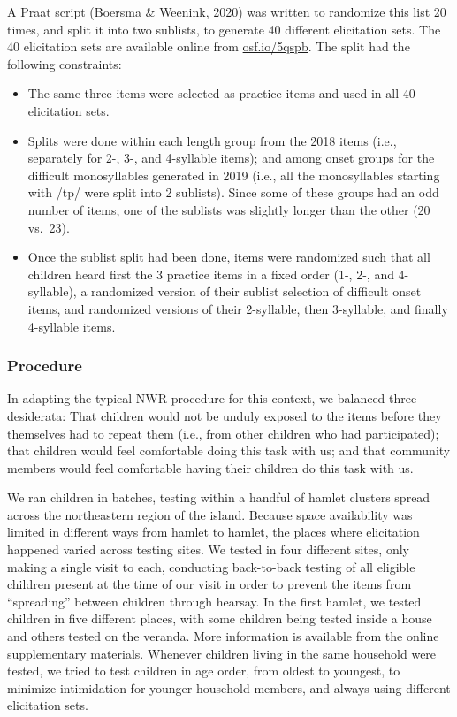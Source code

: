 \documentclass[english,,man,floatsintext]{apa6}
\providecommand{\tightlist}{%
  \setlength{\itemsep}{0pt}\setlength{\parskip}{0pt}}
\begin{document}
A Praat script (Boersma \& Weenink, 2020) was written to randomize this list 20 times, and split it into two sublists, to generate 40 different elicitation sets. The 40 elicitation sets are available online from \href{https://osf.io/5qspb}{osf.io/5qspb}. The split had the following constraints:

\begin{itemize}
\tightlist
\item
  The same three items were selected as practice items and used in all 40 elicitation sets.
\item
  Splits were done within each length group from the 2018 items (i.e., separately for 2-, 3-, and 4-syllable items); and among onset groups for the difficult monosyllables generated in 2019 (i.e., all the monosyllables starting with /tp/ were split into 2 sublists). Since some of these groups had an odd number of items, one of the sublists was slightly longer than the other (20 vs.~23).
\item
  Once the sublist split had been done, items were randomized such that all children heard first the 3 practice items in a fixed order (1-, 2-, and 4-syllable), a randomized version of their sublist selection of difficult onset items, and randomized versions of their 2-syllable, then 3-syllable, and finally 4-syllable items.
\end{itemize}

\hypertarget{procedure}{%
\subsubsection{Procedure}\label{procedure}}

In adapting the typical NWR procedure for this context, we balanced three desiderata: That children would not be unduly exposed to the items before they themselves had to repeat them (i.e., from other children who had participated); that children would feel comfortable doing this task with us; and that community members would feel comfortable having their children do this task with us.

We ran children in batches, testing within a handful of hamlet clusters spread across the northeastern region of the island. Because space availability was limited in different ways from hamlet to hamlet, the places where elicitation happened varied across testing sites. We tested in four different sites, only making a single visit to each, conducting back-to-back testing of all eligible children present at the time of our visit in order to prevent the items from \enquote{spreading} between children through hearsay. In the first hamlet, we tested children in five different places, with some children being tested inside a house and others tested on the veranda. More information is available from the online supplementary materials. Whenever children living in the same household were tested, we tried to test children in age order, from oldest to youngest, to minimize intimidation for younger household members, and always using different elicitation sets.
\end{document}
